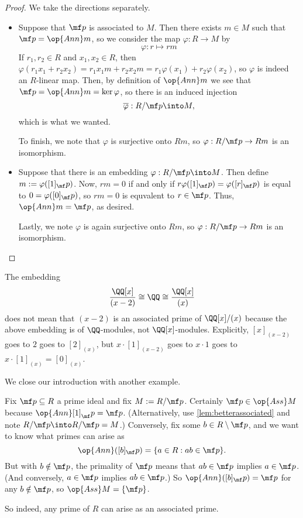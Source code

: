 \begin{proof}
	We take the directions separately.
	\begin{itemize}
		\item Suppose that $\mf p$ is associated to $M$. Then there exists $m\in M$ such that $\mf p=\op{Ann}m$, so we consider the map $\varphi:R\to M$ by
		\[\varphi:r\mapsto rm\]
		If $r_1,r_2\in R$ and $x_1,x_2\in R$, then $\varphi(r_1x_1+r_2x_2)=r_1x_1m+r_2x_2m=r_1\varphi(x_1)+r_2\varphi(x_2)$, so $\varphi$ is indeed an $R$-linear map. Then, by definition of $\op{Ann}m$ we see that $\mf p=\op{Ann}m=\ker\varphi$, so there is an induced injection
		\[\overline\varphi:R/\mf p\into M,\]
		which is what we wanted.

		To finish, we note that $\varphi$ is surjective onto $Rm$, so $\varphi:R/\mf p\to Rm$ is an isomorphism.
		\item Suppose that there is an embedding $\varphi:R/\mf p\into M$. Then define $m:=\varphi([1]_\mf p)$. Now, $rm=0$ if and only if $r\varphi([1]_\mf p)=\varphi([r]_\mf p)$ is equal to $0=\varphi([0]_\mf p)$, so $rm=0$ is equvalent to $r\in\mf p$. Thus, $\op{Ann}m=\mf p$, as desired.

		Lastly, we note $\varphi$ is again surjective onto $Rm$, so $\varphi:R/\mf p\to Rm$ is an isomorphism.
		\qedhere
	\end{itemize}
\end{proof}
\begin{remark}[Nir]
	The embedding
	\[\frac{\QQ[x]}{(x-2)}\cong\QQ\cong\frac{\QQ[x]}{(x)}\]
	does not mean that $(x-2)$ is an associated prime of $\QQ[x]/(x)$ because the above embedding is of $\QQ$-modules, not $\QQ[x]$-modules. Explicitly, $[x]_{(x-2)}$ goes to $2$ goes to $[2]_{(x)}$, but $x\cdot[1]_{(x-2)}$ goes to $x\cdot1$ goes to $x\cdot[1]_{(x)}=[0]_{(x)}$.
\end{remark}
We close our introduction with another example.
\begin{example} \label{ex:assrmodp}
	Fix $\mf p\subseteq R$ a prime ideal and fix $M:=R/\mf p$. Certainly $\mf p\in\op{Ass}M$ because $\op{Ann}[1]_\mf p=\mf p$. (Alternatively, use \autoref{lem:betterassociated} and note $R/\mf p\into R/\mf p=M$.) Conversely, fix some $b\in R\setminus\mf p$, and we want to know what primes can arise as
	\[\op{Ann}([b]_\mf p)=\{a\in R:ab\in\mf p\}.\]
	But with $b\notin\mf p$, the primality of $\mf p$ means that $ab\in\mf p$ implies $a\in\mf p$. (And conversely, $a\in\mf p$ implies $ab\in\mf p$.) So $\op{Ann}([b]_\mf p)=\mf p$ for any $b\notin\mf p$, so $\op{Ass}M=\{\mf p\}$.
\end{example}
So indeed, any prime of $R$ can arise as an associated prime.

